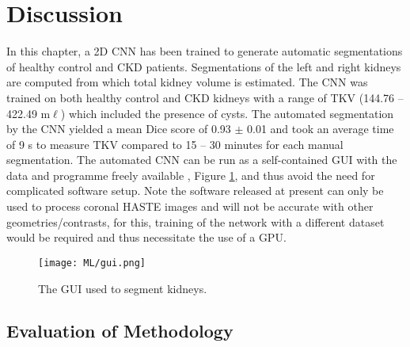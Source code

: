 \newpage

\section{Discussion}
In this chapter, a 2D \ac{CNN} has been trained to generate automatic segmentations of healthy control and \ac{CKD} patients. Segmentations of the left and right kidneys are computed from which total kidney volume is estimated. The \ac{CNN} was trained on both healthy control and \ac{CKD} kidneys with a range of \ac{TKV} (144.76 – 422.49 m$\ell$) which included the presence of cysts. The automated segmentation by the \ac{CNN} yielded a mean Dice score of 0.93 $\pm$ 0.01 and took an average time of 9 s to measure \ac{TKV} compared to 15 – 30 minutes \cite{zollner_assessment_2012} for each manual segmentation. The automated \ac{CNN} can be run as a self-contained \ac{GUI} with the data and programme freely available \cite{daniel_alexdaniel654renal_segmentor_2020}, Figure \ref{fig:ml_gui}, and thus avoid the need for complicated software setup. Note the software released at present can only be used to process coronal HASTE images and will not be accurate with other geometries/contrasts, for this, training of the network with a different dataset would be required and thus necessitate the use of a \ac{GPU}.

\begin{figure}[H]
	\centering
	\texttt{[image: ML/gui.png]}
	\caption{The \acl{GUI} used to segment kidneys.}
	\label{fig:ml_gui}	
\end{figure}

\newpage
\subsection{Evaluation of Methodology}

